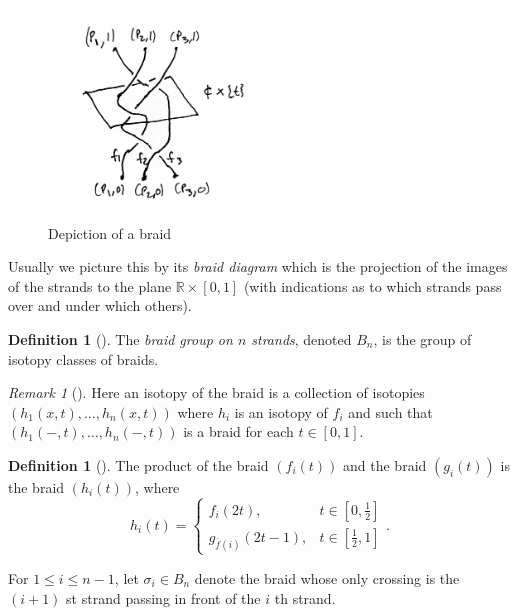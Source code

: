 \documentclass[reqno]{amsart}
\theoremstyle{definition}
\newtheorem{definition}[theorem]{Definition}
\theoremstyle{remark}
\newtheorem*{remark}{Remark}
\begin{document}
\begin{figure}[H]
    \centering
    \includegraphics[width=0.5\textwidth]{braid-diagram.jpg}
    \caption{Depiction of a braid}
    \label{fig:braid-diagram-jpg}
\end{figure}

Usually we picture
this by its \textit{braid diagram} which is
the projection of the images of the strands to
the plane $\mathbb{R} \times \left[ 0,1 \right] $ (with
indications as to which strands pass over and under which
others).

\begin{definition}[]
    The \textit{braid group on $n$ strands}, denoted
    $B_n$, is the group of isotopy classes of braids.
\end{definition}

\begin{remark}[]
    Here an isotopy of the braid is a collection of isotopies
    $\left( h_1(x,t), \ldots, h_n(x,t) \right) $ where
    $h_i$ is an isotopy of $f_i$ and such that
    $\left( h_1 \left( -,t \right) , \ldots,
    h_n \left( -,t \right) \right) $ is a braid
    for each $t \in \left[ 0,1 \right] $.
\end{remark}

\begin{definition}[]
    The product of the braid $\left( f_i(t) \right) $ and
    the braid  $\left( g_i(t) \right) $ is the
    braid $\left( h_i(t) \right) $, where
    \[
    h_i(t) = 
    \begin{cases}
        f_i(2t),& t \in \left[ 0, \frac{1}{2} \right] \\
        g_{\overline{f}(i)}(2t-1),& t \in \left[ \frac{1}{2},1
        \right] 
    \end{cases}.
    \] 
\end{definition}

For $1 \le i \le n-1$, let
$\sigma_i \in B_n$ denote the braid
whose only crossing is the
$\left( i+1 \right) $ st strand passing in front
of the $i$ th strand.
\end{document}
